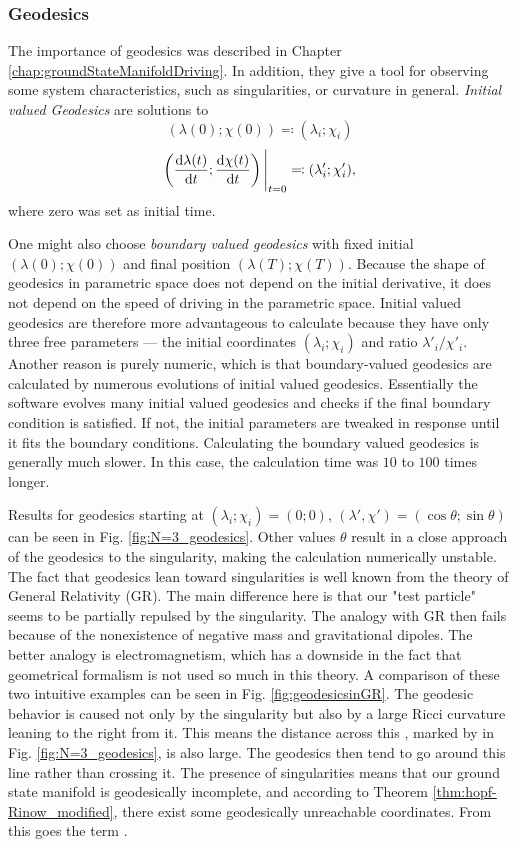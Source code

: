 \subsubsection{Geodesics}
The importance of geodesics was described in Chapter \ref{chap:groundStateManifoldDriving}. In addition, they give a tool for observing some system characteristics, such as singularities, or curvature in general. \emph{Initial valued Geodesics} are solutions to
$$(\lambda(0);\chi(0))\eqqcolon (\lambda_i;\chi_i)$$
$$\left(\frac{\mathrm{d} \lambda(t)}{\mathrm{d} t};\frac{\mathrm{d} \chi(t)}{\mathrm{d} t}\right)\Bigg|_{t=0} \eqqcolon (\lambda'_i;\chi'_i),$$
where zero was set as initial time.

One might also choose \emph{boundary valued geodesics} with fixed initial $(\lambda(0);\chi(0))$ and final position $(\lambda(T);\chi(T))$. Because the shape of geodesics in parametric space does not depend on the initial derivative, it does not depend on the speed of driving in the parametric space. Initial valued geodesics are therefore more advantageous to calculate because they have only three free parameters — the initial coordinates $(\lambda_i;\chi_i)$ and ratio $\lambda'_i/\chi'_i$. Another reason is purely numeric, which is that boundary-valued geodesics are calculated by numerous evolutions of initial valued geodesics. Essentially the software evolves many initial valued geodesics and checks if the final boundary condition is satisfied. If not, the initial parameters are tweaked in response until it fits the boundary conditions. Calculating the boundary valued geodesics is generally much slower. In this case, the calculation time was $10$ to $100$ times longer.

Results for geodesics starting at $(\lambda_i;\chi_i)=(0;0)$, $
(\lambda',\chi')=(\cos\theta;\sin\theta)$ can be seen in Fig. \ref{fig:N=3_geodesics}. Other values $\theta$ result in a close approach of the geodesics to the singularity, making the calculation numerically unstable. The fact that geodesics lean toward singularities is well known from the theory of General Relativity (GR). The main difference here is that our "test particle" seems to be partially repulsed by the singularity. The analogy with GR then fails because of the nonexistence of negative mass and gravitational dipoles. The better analogy is electromagnetism, which has a downside in the fact that geometrical formalism is not used so much in this theory. A comparison of these two intuitive examples can be seen in Fig. \ref{fig:geodesicsinGR}. The geodesic behavior is caused not only by the singularity but also by a large Ricci curvature leaning to the right from it. This means the distance across this \emph{}, marked by  in Fig. \ref{fig:N=3_geodesics}, is also large. The geodesics then tend to go around this line rather than crossing it. The presence of singularities means that our ground state manifold is geodesically incomplete, and according to Theorem \ref{thm:hopf-Rinow_modified}, there exist some geodesically unreachable coordinates. From this goes the term \emph{}.

